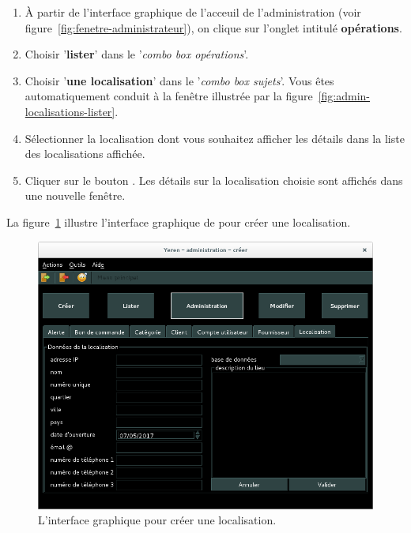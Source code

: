 \begin{enumerate}[1)]
	\item \`A partir de l'interface graphique de l'acceuil de
		l'administration (voir figure~\ref{fig:fenetre-administrateur}),
		on clique sur l'onglet intitul\'e \textbf{op\'erations}. 
		
	\item Choisir '\textbf{lister}' dans le '\emph{combo box
		op\'erations}'.
		
	\item Choisir '\textbf{une localisation}' dans le '\emph{combo box
		sujets}'. Vous \^etes automatiquement conduit \`a la fen\^etre
		illustr\'ee par la figure~\ref{fig:admin-localisations-lister}.
		
	\item S\'electionner la localisation dont vous souhaitez afficher
		les d\'etails dans la liste des localisations affich\'ee.
		
	\item Cliquer sur le bouton . Les d\'etails
		sur la localisation choisie sont affich\'es dans
		une nouvelle fen\^etre.
\end{enumerate}



La figure~\ref{fig:admin-localisations-creer} illustre
l'interface graphique de \yeren pour cr\'eer une localisation.\\

\begin{figure}[!htpb]
	\centering
	\includegraphics[scale=0.45]{images/localisation-creer.png}
	\caption{L'interface graphique pour cr\'eer une localisation.}
	\label{fig:admin-localisations-creer}
\end{figure}


